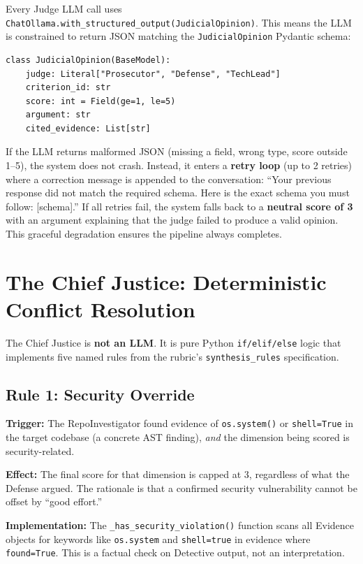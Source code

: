 \documentclass[12pt,a4paper]{article}
\begin{document}
Every Judge LLM call uses \texttt{ChatOllama.with\_structured\_output(JudicialOpinion)}. This means the LLM is constrained to return JSON matching the \texttt{JudicialOpinion} Pydantic schema:

\begin{lstlisting}[caption={JudicialOpinion schema enforced on every LLM call}]
class JudicialOpinion(BaseModel):
    judge: Literal["Prosecutor", "Defense", "TechLead"]
    criterion_id: str
    score: int = Field(ge=1, le=5)
    argument: str
    cited_evidence: List[str]
\end{lstlisting}

If the LLM returns malformed JSON (missing a field, wrong type, score outside 1--5), the system does not crash. Instead, it enters a \textbf{retry loop} (up to 2 retries) where a correction message is appended to the conversation: ``Your previous response did not match the required schema. Here is the exact schema you must follow: [schema].'' If all retries fail, the system falls back to a \textbf{neutral score of 3} with an argument explaining that the judge failed to produce a valid opinion. This graceful degradation ensures the pipeline always completes.


\section{The Chief Justice: Deterministic Conflict Resolution}
\label{sec:rules}

The Chief Justice is \textbf{not an LLM}. It is pure Python \texttt{if/elif/else} logic that implements five named rules from the rubric's \texttt{synthesis\_rules} specification.

\subsection{Rule 1: Security Override}

\textbf{Trigger:} The RepoInvestigator found evidence of \texttt{os.system()} or \texttt{shell=True} in the target codebase (a concrete AST finding), \emph{and} the dimension being scored is security-related.

\textbf{Effect:} The final score for that dimension is capped at 3, regardless of what the Defense argued. The rationale is that a confirmed security vulnerability cannot be offset by ``good effort.''

\textbf{Implementation:} The \texttt{\_has\_security\_violation()} function scans all Evidence objects for keywords like \texttt{os.system} and \texttt{shell=true} in evidence where \texttt{found=True}. This is a factual check on Detective output, not an interpretation.
\end{document}
